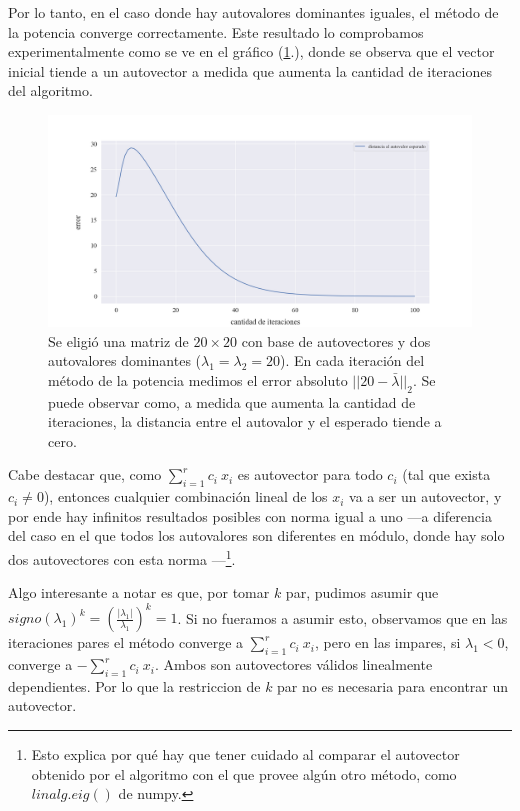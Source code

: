 \vspace{1em}
Por lo tanto, en el caso donde hay autovalores dominantes iguales, el método de la potencia converge correctamente. Este resultado lo comprobamos experimentalmente como se ve en el gráfico (\ref{fig:autovalor_repetido}.), donde se observa que el vector inicial tiende a un autovector a medida que aumenta la cantidad de iteraciones del algoritmo.

\vspace{1em}
\begin{figure}[!htbp]
    \includegraphics[scale=0.45]{files/src/.media/op_autovalor_repetido.png}
    \caption{Se eligió una matriz de $20 \times 20$ con base de autovectores y dos autovalores dominantes ($\lambda_1 = \lambda_2 = 20$). En cada iteración del método de la potencia medimos el error absoluto $||20 - \bar{\lambda}||_2$. Se puede observar como, a medida que aumenta la cantidad de iteraciones, la distancia entre el autovalor y el esperado tiende a cero.}
    \label{fig:autovalor_repetido}
\end{figure}

\vspace{1em}
Cabe destacar que, como $\sum_{i=1}^{r} c_i\ x_i$ es autovector para todo $c_i$ (tal que exista $c_i \neq 0$), entonces cualquier combinación lineal de los $x_i$ va a ser un autovector, y por ende hay infinitos resultados posibles con norma igual a uno ---a diferencia del caso en el que todos los autovalores son diferentes en módulo, donde hay solo dos autovectores con esta norma ---\footnote{Esto explica por qué hay que tener cuidado al comparar el autovector obtenido por el algoritmo con el que provee algún otro método, como $linalg.eig()$ de numpy.}.

\vspace{1em}
Algo interesante a notar es que, por tomar $k$ par, pudimos asumir que $signo(\lambda_1)^k = (\frac{|\lambda_{1}|}{\lambda_{1}})^k = 1$. Si no fueramos a asumir esto, observamos que en las iteraciones pares el método converge a $\sum_{i=1}^{r} c_i\ x_i$, pero en las impares, si $\lambda_1 < 0$, converge a $-\sum_{i=1}^{r} c_i\ x_i$. Ambos son autovectores válidos linealmente dependientes. Por lo que la restriccion de $k$ par no es necesaria para encontrar un autovector.

